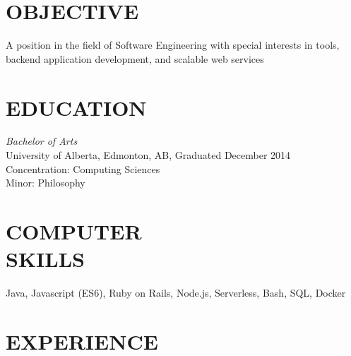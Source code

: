 \documentclass[margin, 10pt]{res} %
\begin{document}
\begin{resume}

 
\section{OBJECTIVE}  

A position in the field of Software Engineering with special interests in tools, backend application development, and scalable web services 


\section{EDUCATION}

{\sl Bachelor of Arts}\\
University of Alberta, Edmonton, AB, Graduated December 2014 \\
Concentration: Computing Sciences \\
Minor: Philosophy
 

\section{COMPUTER \\ SKILLS} 

Java, Javascript (ES6), Ruby on Rails, Node.js, Serverless, Bash, SQL, Docker\\
 
 
\section{EXPERIENCE}


\end{resume}
\end{document}
